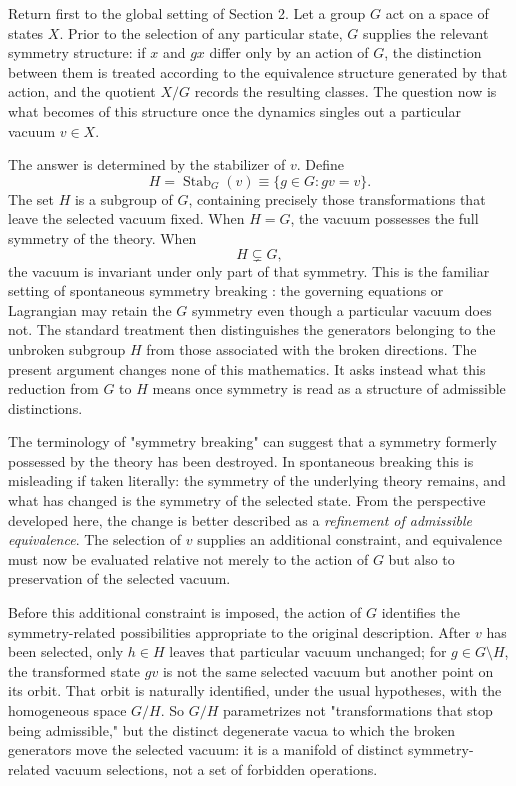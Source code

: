 \documentclass[11pt]{article}
\begin{document}
Return first to the global setting of Section 2. Let a group $G$ act on a space of states $X$. Prior to the selection of any particular state, $G$ supplies the relevant symmetry structure: if $x$ and $gx$ differ only by an action of $G$, the distinction between them is treated according to the equivalence structure generated by that action, and the quotient $X/G$ records the resulting classes. The question now is what becomes of this structure once the dynamics singles out a particular vacuum $v \in X$.

The answer is determined by the stabilizer of $v$. Define
\[
H = \operatorname{Stab}_G(v) \equiv \{g \in G : gv = v\}.
\]
The set $H$ is a subgroup of $G$, containing precisely those transformations that leave the selected vacuum fixed. When $H = G$, the vacuum possesses the full symmetry of the theory. When
\[
H \subsetneq G,
\]
the vacuum is invariant under only part of that symmetry. This is the familiar setting of spontaneous symmetry breaking \cite{Barnes2010}: the governing equations or Lagrangian may retain the $G$ symmetry even though a particular vacuum does not. The standard treatment then distinguishes the generators belonging to the unbroken subgroup $H$ from those associated with the broken directions. The present argument changes none of this mathematics. It asks instead what this reduction from $G$ to $H$ means once symmetry is read as a structure of admissible distinctions.

The terminology of "symmetry breaking" can suggest that a symmetry formerly possessed by the theory has been destroyed. In spontaneous breaking this is misleading if taken literally: the symmetry of the underlying theory remains, and what has changed is the symmetry of the selected state. From the perspective developed here, the change is better described as a \emph{refinement of admissible equivalence}. The selection of $v$ supplies an additional constraint, and equivalence must now be evaluated relative not merely to the action of $G$ but also to preservation of the selected vacuum.

Before this additional constraint is imposed, the action of $G$ identifies the symmetry-related possibilities appropriate to the original description. After $v$ has been selected, only $h \in H$ leaves that particular vacuum unchanged; for $g \in G \setminus H$, the transformed state $gv$ is not the same selected vacuum but another point on its orbit. That orbit is naturally identified, under the usual hypotheses, with the homogeneous space $G/H$. So $G/H$ parametrizes not "transformations that stop being admissible," but the distinct degenerate vacua to which the broken generators move the selected vacuum: it is a manifold of distinct symmetry-related vacuum selections, not a set of forbidden operations.
\end{document}
